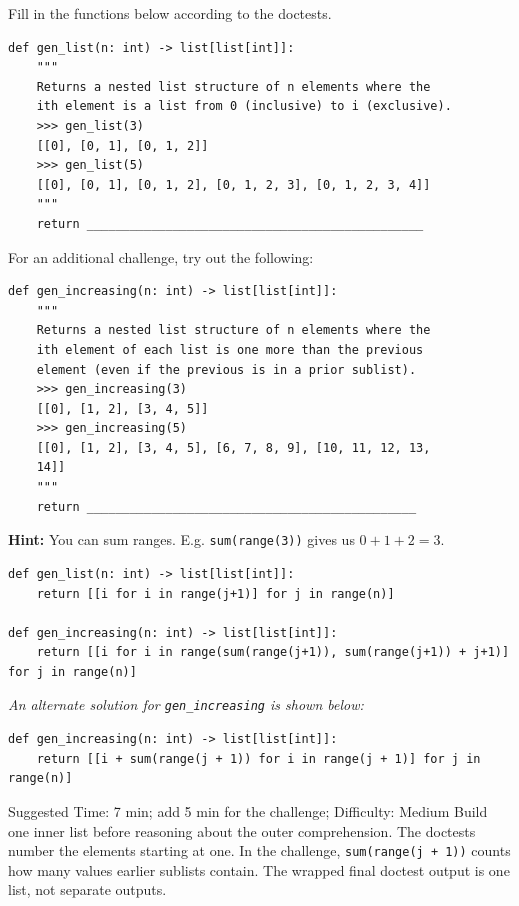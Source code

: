 \begin{blocksection}
\begin{blocksection}
\question Fill in the functions below according to the doctests.
\end{blocksection}

\begin{lstlisting}
def gen_list(n: int) -> list[list[int]]:
    """
    Returns a nested list structure of n elements where the
    ith element is a list from 0 (inclusive) to i (exclusive).
    >>> gen_list(3)
    [[0], [0, 1], [0, 1, 2]]
    >>> gen_list(5)
    [[0], [0, 1], [0, 1, 2], [0, 1, 2, 3], [0, 1, 2, 3, 4]]
    """
    return _______________________________________________
\end{lstlisting}

For an additional challenge, try out the following:

\begin{lstlisting}
def gen_increasing(n: int) -> list[list[int]]:
    """
    Returns a nested list structure of n elements where the
    ith element of each list is one more than the previous
    element (even if the previous is in a prior sublist).
    >>> gen_increasing(3)
    [[0], [1, 2], [3, 4, 5]]
    >>> gen_increasing(5)
    [[0], [1, 2], [3, 4, 5], [6, 7, 8, 9], [10, 11, 12, 13,
    14]]
    """
    return ______________________________________________
\end{lstlisting}

\textbf{Hint:} You can sum ranges. E.g. \texttt{sum(range(3))} gives us $0 + 1 + 2 = 3$.

\begin{solution}
\begin{lstlisting}
def gen_list(n: int) -> list[list[int]]:
    return [[i for i in range(j+1)] for j in range(n)]

def gen_increasing(n: int) -> list[list[int]]:
    return [[i for i in range(sum(range(j+1)), sum(range(j+1)) + j+1)] for j in range(n)]
\end{lstlisting}

\textit{An alternate solution for \texttt{gen\_increasing} is shown below:}

\begin{lstlisting}
def gen_increasing(n: int) -> list[list[int]]:
    return [[i + sum(range(j + 1)) for i in range(j + 1)] for j in range(n)]
\end{lstlisting}
\end{solution}
\end{blocksection}

\begin{questionmeta}
    Suggested Time: 7 min; add 5 min for the challenge; Difficulty: Medium
    Build one inner list before reasoning about the outer comprehension. The doctests number the elements starting at one. In the challenge, \lstinline{sum(range(j + 1))} counts how many values earlier sublists contain. The wrapped final doctest output is one list, not separate outputs.
\end{questionmeta}
